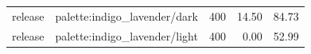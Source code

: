 \begin{longtable}{l>{\raggedright\arraybackslash}p{.42\linewidth}rrr}
release & %
palette:indigo\_\allowbreak{}lavender/dark & %
400 & %
14.50 & %
84.73 \\ %

release & %
palette:indigo\_\allowbreak{}lavender/light & %
400 & %
0.00 & %
52.99 \\ %


\end{longtable}
